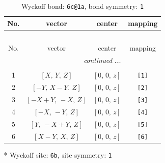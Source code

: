 \documentclass[fleqn,8pt]{jsarticle}
\begin{document}
\renewcommand{\arraystretch}{1.2}
\begin{longtable}{cccc}
\caption{Wyckoff bond: {\tt 6c@1a}, bond symmetry: {\tt 1}}
 \\
 \hline \hline
No. & vector & center & mapping \\ \hline \endfirsthead

\multicolumn{3}{l}{\tablename\ \thetable{}} \\
 \hline \hline
No. & vector & center & mapping \\ \hline \endhead

 \hline \hline
\multicolumn{3}{r}{\footnotesize\it continued ...} \\ \endfoot

 \hline \hline
\multicolumn{3}{r}{} \\ \endlastfoot

1 & $\left[ X,\, Y,\, Z \right]$ & $\left[ 0,\, 0,\, z \right]$ & {\tt [1]} \\ \hline
2 & $\left[ - Y,\, X - Y,\, Z \right]$ & $\left[ 0,\, 0,\, z \right]$ & {\tt [2]} \\ \hline
3 & $\left[ - X + Y,\, - X,\, Z \right]$ & $\left[ 0,\, 0,\, z \right]$ & {\tt [3]} \\ \hline
4 & $\left[ - X,\, - Y,\, Z \right]$ & $\left[ 0,\, 0,\, z \right]$ & {\tt [4]} \\ \hline
5 & $\left[ Y,\, - X + Y,\, Z \right]$ & $\left[ 0,\, 0,\, z \right]$ & {\tt [5]} \\ \hline
6 & $\left[ X - Y,\, X,\, Z \right]$ & $\left[ 0,\, 0,\, z \right]$ & {\tt [6]} \\
\end{longtable}
* Wyckoff site: {\tt 6b}, site symmetry: {\tt 1}
\renewcommand{\arraystretch}{1.2}
\end{document}

